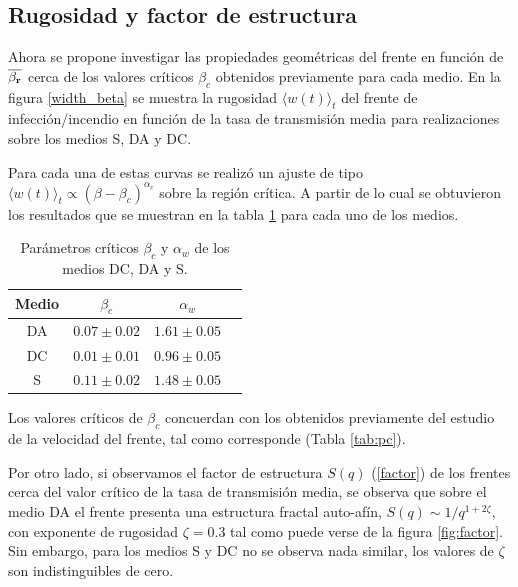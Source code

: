 \subsection{Rugosidad y factor de estructura}

Ahora se propone investigar las propiedades geométricas del frente en función de $\overline{\beta_{\vb r}}$ cerca de los valores críticos $\beta_c$ obtenidos 
previamente para cada medio. En la figura \ref{width_beta} se muestra la rugosidad $\langle w(t)\rangle_t$ del frente de infección/incendio en función de la tasa de 
transmisión media para realizaciones sobre los medios S, DA y DC.

Para cada una de estas curvas se realizó un ajuste de tipo $\langle w(t)\rangle_t\propto(\beta-\beta_c)^{\alpha_c}$ sobre la región crítica. A partir de lo cual se 
obtuvieron los resultados que se muestran en la tabla \ref{tab:pc_I} para cada uno de los medios.

\begin{table}[h]
    \centering
    \caption{Parámetros críticos $\beta_c$ y $\alpha_w$ de los medios DC, DA y S.}
    \label{tab:pc_I}
    \begin{tabular}{@{}cccc@{}}
    \toprule
    Medio & $\beta_c$     & $\alpha_w$    \\ \midrule
    DA    & $0.07\pm0.02$ & $1.61\pm0.05$ \\
    DC    & $0.01\pm0.01$ & $0.96\pm0.05$ \\
    S     & $0.11\pm0.02$ & $1.48\pm0.05$ \\ \bottomrule
    \end{tabular}
\end{table}

Los valores críticos de $\beta_c$ concuerdan con los obtenidos previamente del estudio de la velocidad del frente, tal como corresponde (Tabla \ref{tab:pc}).

Por otro lado, si observamos el factor de estructura $S(q)$ (\ref{factor}) de los frentes cerca del valor crítico de la tasa de transmisión media, se observa que 
sobre el medio DA el frente presenta una estructura fractal auto-afín, $S(q)\sim 1/q^{1+2\zeta}$, con exponente de rugosidad $\zeta=0.3$ tal como puede verse de 
la figura \ref{fig:factor}. Sin embargo, para los medios S y DC no se observa nada similar, los valores de $\zeta$ son indistinguibles de cero.\newpage


